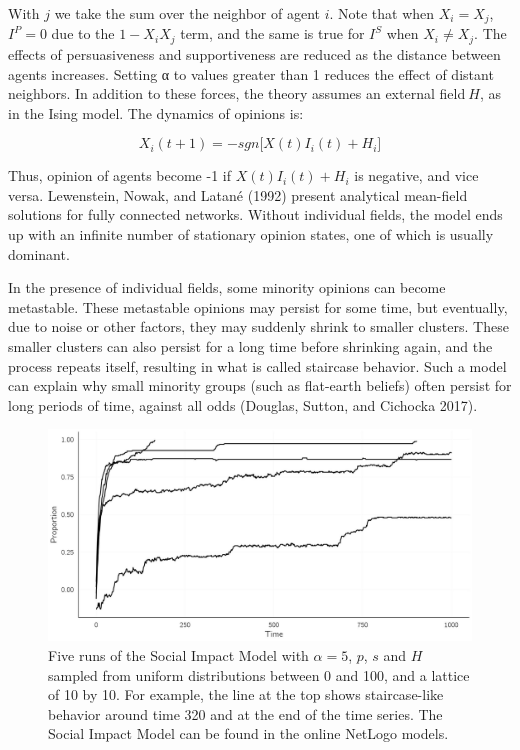 \documentclass[
  a4paper,
  DIV=11,
  numbers=noendperiod,
  oneside]{scrreprt}
\begin{document}
With \(j\) we take the sum over the neighbor of agent \(i\). Note that
when \(X_{i} = X_{j}\), \(I^{P} = 0\) due to the \(1 - X_{i}X_{j}\)
term, and the same is true for \(I^{S}\) when \(X_{i} \neq X_{j}\). The
effects of persuasiveness and supportiveness are reduced as the distance
between agents increases. Setting α to values greater than 1 reduces the
effect of distant neighbors. In addition to these forces, the theory
assumes an external field\(\ H\), as in the Ising model. The dynamics of
opinions is:

\[X_{i}(t + 1) = - sgn\lbrack X(t)I_{i}(t) + H_{i}\rbrack\]

Thus, opinion of agents become -1 if \(X(t)I_{i}(t) + H_{i}\) is
negative, and vice versa. Lewenstein, Nowak, and Latané (1992) present
analytical mean-field solutions for fully connected networks. Without
individual fields, the model ends up with an infinite number of
stationary opinion states, one of which is usually dominant.

In the presence of individual fields, some minority opinions can become
metastable. These metastable opinions may persist for some time, but
eventually, due to noise or other factors, they may suddenly shrink to
smaller clusters. These smaller clusters can also persist for a long
time before shrinking again, and the process repeats itself, resulting
in what is called staircase behavior. Such a model can explain why small
minority groups (such as flat-earth beliefs) often persist for long
periods of time, against all odds (Douglas, Sutton, and Cichocka 2017).

\begin{figure}

{\centering \includegraphics{media/ch7/fig-ch7-img6-old-94.jpg}

}

\caption{\label{fig-ch7-img6-old-94}Five runs of the Social Impact Model
with \(\alpha = 5\), \(p\), \(s\) and \(H\) sampled from uniform
distributions between 0 and 100, and a lattice of 10 by 10. For example,
the line at the top shows staircase-like behavior around time 320 and at
the end of the time series. The Social Impact Model can be found in the
online NetLogo models.}

\end{figure}
\end{document}
